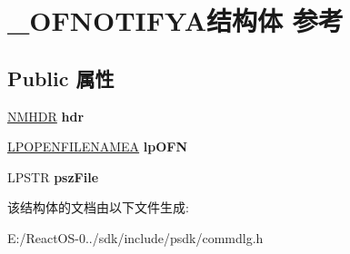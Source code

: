 \hypertarget{struct___o_f_n_o_t_i_f_y_a}{}\section{\+\_\+\+O\+F\+N\+O\+T\+I\+F\+Y\+A结构体 参考}
\label{struct___o_f_n_o_t_i_f_y_a}
\subsection*{Public 属性}
\begin{DoxyCompactItemize}
\item 
\mbox{\label{struct___o_f_n_o_t_i_f_y_a_a033c904daf2d9a06f1a80ff0afa6db12}} 
\hyperlink{structtag_n_m_h_d_r}{N\+M\+H\+DR} {\bfseries hdr}
\item 
\mbox{\label{struct___o_f_n_o_t_i_f_y_a_a5dd17d3e2a2eabe0448e8fc6bbd67b25}} 
\hyperlink{structtag_o_f_n_a}{L\+P\+O\+P\+E\+N\+F\+I\+L\+E\+N\+A\+M\+EA} {\bfseries lp\+O\+FN}
\item 
\mbox{\label{struct___o_f_n_o_t_i_f_y_a_af083fa834627a921073a2660a52c187f}} 
L\+P\+S\+TR {\bfseries psz\+File}
\end{DoxyCompactItemize}


该结构体的文档由以下文件生成\+:\begin{DoxyCompactItemize}
\item 
E\+:/\+React\+O\+S-\/0../sdk/include/psdk/commdlg.\+h\end{DoxyCompactItemize}
